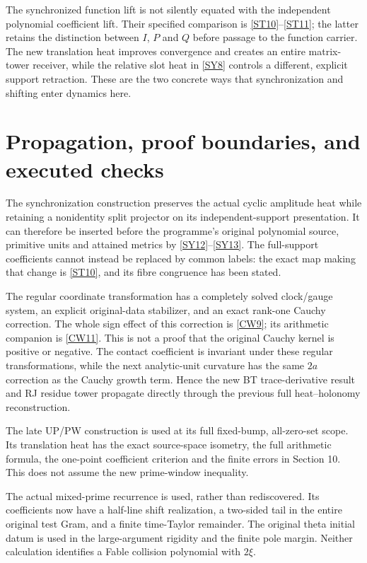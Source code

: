 \documentclass[11pt,a4paper]{article}
\theoremstyle{definition}\newtheorem{definition}[theorem]{Definition}
\begin{document}
The synchronized function lift is not silently equated with the independent polynomial coefficient lift. Their specified comparison is \eqref{ST10}--\eqref{ST11}; the latter retains the distinction between $I$, $P$ and $Q$ before passage to the function carrier. The new translation heat improves convergence and creates an entire matrix-tower receiver, while the relative slot heat in \eqref{SY8} controls a different, explicit support retraction. These are the two concrete ways that synchronization and shifting enter dynamics here.

\section{Propagation, proof boundaries, and executed checks}
The synchronization construction preserves the actual cyclic amplitude heat while retaining a nonidentity split projector on its independent-support presentation. It can therefore be inserted before the programme's original polynomial source, primitive units and attained metrics by \eqref{SY12}--\eqref{SY13}. The full-support coefficients cannot instead be replaced by common labels: the exact map making that change is \eqref{ST10}, and its fibre congruence has been stated.

The regular coordinate transformation has a completely solved clock/gauge system, an explicit original-data stabilizer, and an exact rank-one Cauchy correction. The whole sign effect of this correction is \eqref{CW9}; its arithmetic companion is \eqref{CW11}. This is not a proof that the original Cauchy kernel is positive or negative. The contact coefficient is invariant under these regular transformations, while the next analytic-unit curvature has the same $2a$ correction as the Cauchy growth term. Hence the new BT trace-derivative result and RJ residue tower propagate directly through the previous full heat--holonomy reconstruction.

The late UP/PW construction is used at its full fixed-bump, all-zero-set scope. Its translation heat has the exact source-space isometry, the full arithmetic formula, the one-point coefficient criterion and the finite errors in Section 10. This does not assume the new prime-window inequality.

The actual mixed-prime recurrence is used, rather than rediscovered. Its coefficients now have a half-line shift realization, a two-sided tail in the entire original test Gram, and a finite time-Taylor remainder. The original theta initial datum is used in the large-argument rigidity and the finite pole margin. Neither calculation identifies a Fable collision polynomial with $2\xi$.
\end{document}
